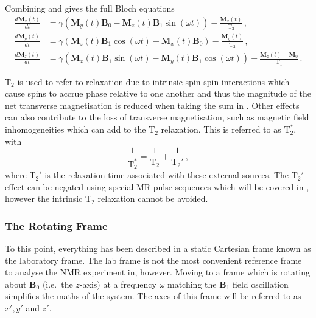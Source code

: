 Combining  and  gives the full Bloch equations
\begin{align}
	\frac{d\mathbf{M}_x(t)}{dt} &= \gamma\left(\mathbf{M}_y(t)\mathbf{B}_0 - \mathbf{M}_z(t)\mathbf{B}_1\sin(\omega t)\right) - \frac{\mathbf{M}_x(t)}{\mathrm{T}_2}\,,\label{eq:bloch_labx}\\
	\frac{d\mathbf{M}_y(t)}{dt} &= \gamma\left(\mathbf{M}_z(t)\mathbf{B}_1\cos(\omega t) - \mathbf{M}_x(t)\mathbf{B}_0\right) - \frac{\mathbf{M}_y(t)}{\mathrm{T}_2}\,,\label{eq:bloch_laby}\\
	\frac{d\mathbf{M}_z(t)}{dt} &= \gamma \left(\mathbf{M}_x(t)\mathbf{B}_1\sin(\omega t) - \mathbf{M}_y(t)\mathbf{B}_1\cos(\omega t) \right) - \frac{\mathbf{M}_z(t) - \mathbf{M}_0}{\mathrm{T}_1}\,. \label{eq:bloch_labz}
\end{align}

$\mathrm{T}_2$ is used to refer to relaxation due to intrinsic spin-spin interactions which cause spins to accrue phase relative to one another and thus the magnitude of the net transverse magnetisation is reduced when taking the sum in  .
Other effects can also contribute to the loss of transverse magnetisation, such as magnetic field inhomogeneities which can add to the $\mathrm{T}_2$ relaxation.
This is referred to as $\mathrm{T}_2^*$, with
\begin{equation}
  \frac{1}{\mathrm{T}_2^*} = \frac{1}{\mathrm{T}_2} + \frac{1}{\mathrm{T}_2'}\,,
  \label{eq:t2star}
\end{equation}
where $\mathrm{T}_2'$ is the relaxation time associated with these external sources. The $\mathrm{T}_2'$ effect can be negated using special MR pulse sequences which will be covered in , however the intrinsic $\mathrm{T}_2$ relaxation cannot be avoided.  


\subsubsection{The Rotating Frame}
To this point, everything has been described in a static Cartesian frame known as the laboratory frame. 
The lab frame is not the most convenient reference frame to analyse the \ac{NMR} experiment in, however.
Moving to a frame which is rotating about $\mathbf{B}_0$ (i.e.\ the $z$-axis) at a frequency $\omega$ matching the $\mathbf{B}_1$ field oscillation simplifies the maths of the system. 
The axes of this frame will be referred to as $x', y'$ and $z'$. 

